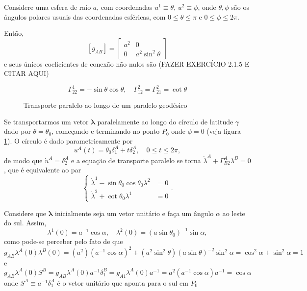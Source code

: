 \begin{exemplo}
Considere uma esfera de raio $a$, com coordenadas $u^1\equiv \theta,\, u^2\equiv\phi$, onde $\theta,\phi$ são os ângulos polares usuais das coordenadas esféricas, com $0\leq\theta\leq\pi$ e $0\leq\phi\leq 2\pi$.

Então, 
\[
\left[g_{A B}\right]=\left[\begin{array}{cc}{a^{2}} & {0} \\ {0} & {a^{2} \sin ^{2} \theta}\end{array}\right]
\]
e seus únicos coeficientes de conexão não nulos são {\color{red}(FAZER EXERCÍCIO 2.1.5 E CITAR AQUI)} 

\[
	\Gamma_{22}^{1}=-\sin \theta \cos \theta, \quad \Gamma_{12}^{2}=\Gamma_{21}^{2}=\cot \theta
\]

\begin{figure}[t]
	\centering
	\caption{Transporte paralelo ao longo de um paralelo geodésico}
	\label{fig:EsferaTransporteParalelo}
\end{figure}


Se transportarmos um vetor $\boldsymbol{\lambda}$ paralelamente ao longo do círculo de latitude $\gamma$ dado por $\theta=\theta_0$, começando e terminando no ponto $P_0$ onde $\phi=0$ (veja figura \ref{fig:EsferaTransporteParalelo}). O círculo é dado parametricamente por
\[u^{A}(t)=\theta_{0} \delta_{1}^{A}+t \delta_{2}^{A}, \quad 0 \leq t \leq 2 \pi,\]
de modo que $\dot{u}^{A}=\delta_{2}^{A}$ e a equação de transporte paralelo se torna $\dot{\lambda}^{A}+\Gamma_{B 2}^{A} \lambda^{B}=0$, que é equivalente ao par
\begin{equation}\label{eq:EquacoesTransporteLambda}
\left\{\begin{aligned} \dot{\lambda}^{1}-\sin \theta_{0} \cos \theta_{0} \lambda^{2} &=0 \\ \dot{\lambda}^{2}+\cot \theta_{0} \lambda^{1} &=0 \end{aligned}\right. .
\end{equation}

Considere que $\boldsymbol{\lambda}$ inicialmente seja um vetor unitário e faça um ângulo $\alpha$ ao leste do sul. Assim,
\begin{equation}\label{eq:CondicoesIniciaisLambda}
	\lambda^{1}(0)=a^{-1} \cos \alpha, \quad \lambda^{2}(0)=\left(a \sin \theta_{0}\right)^{-1} \sin \alpha ,
\end{equation}
como pode-se perceber pelo fato de que
\[
	g_{AB}\lambda^A(0)\lambda^B(0)=(a^2)(a^{-1}\cos\alpha)^2+(a^2\sin^2\theta)(a\sin\theta)^{-2}\sin^2\alpha=\cos^2\alpha+\sin^2\alpha=1
\]
e
\[
	g_{AB}\lambda^A(0)S^B = g_{AB}\lambda^A(0)a^{-1}\delta^B_1=g_{A1}\lambda^A(0)a^{-1}=a^2(a^{-1}\cos\alpha)a^{-1}=\cos\alpha
\]
onde $S^A\equiv a^{-1}\delta^A_1$ é o vetor unitário que aponta para o sul em $P_0$


\end{exemplo}
